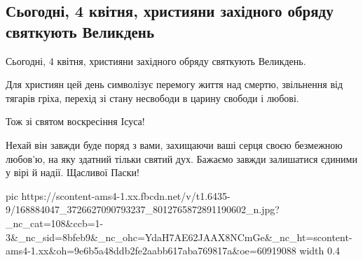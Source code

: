  
 
 
 
 

\subsection{Сьогодні, 4 квітня, християни західного обряду святкують Великдень}

Сьогодні, 4 квітня, християни західного обряду святкують Великдень. 

Для християн цей день символізує перемогу життя над смертю, звільнення від
тягарів гріха, перехід зі стану несвободи в царину свободи і любові.  

Тож зі святом воскресіння Ісуса! 

Нехай він завжди буде поряд з вами, захищаючи ваші серця своєю безмежною
любов'ю, на яку здатний тільки святий дух. Бажаємо завжди залишатися єдиними у
вірі й надії. Щасливої Паски!

\ifcmt
  pic https://scontent-ams4-1.xx.fbcdn.net/v/t1.6435-9/168884047_3726627090793237_8012765872891190602_n.jpg?_nc_cat=108&ccb=1-3&_nc_sid=8bfeb9&_nc_ohc=YdaH7AE62JAAX8NCmGe&_nc_ht=scontent-ams4-1.xx&oh=9e6b5a48ddb2fe2aabb617aba769817a&oe=60919088
  width 0.4
\fi

